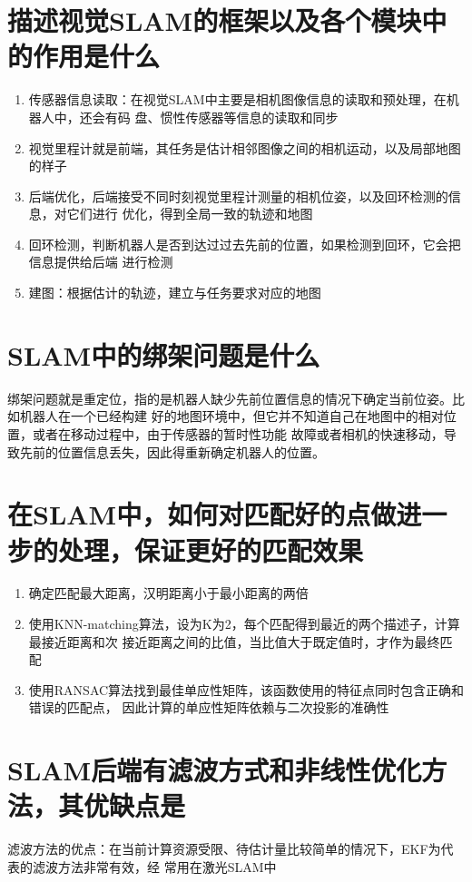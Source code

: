 \documentclass[10pt]{article}
\begin{document}
\section{描述视觉SLAM的框架以及各个模块中的作用是什么}
\begin{enumerate}
    \item 传感器信息读取：在视觉SLAM中主要是相机图像信息的读取和预处理，在机器人中，还会有码
    盘、惯性传感器等信息的读取和同步
    \item 视觉里程计就是前端，其任务是估计相邻图像之间的相机运动，以及局部地图的样子
    \item 后端优化，后端接受不同时刻视觉里程计测量的相机位姿，以及回环检测的信息，对它们进行
    优化，得到全局一致的轨迹和地图
    \item 回环检测，判断机器人是否到达过过去先前的位置，如果检测到回环，它会把信息提供给后端
    进行检测
    \item 建图：根据估计的轨迹，建立与任务要求对应的地图
\end{enumerate}
\section{SLAM中的绑架问题是什么}
绑架问题就是重定位，指的是机器人缺少先前位置信息的情况下确定当前位姿。比如机器人在一个已经构建
好的地图环境中，但它并不知道自己在地图中的相对位置，或者在移动过程中，由于传感器的暂时性功能
故障或者相机的快速移动，导致先前的位置信息丢失，因此得重新确定机器人的位置。
\section{在SLAM中，如何对匹配好的点做进一步的处理，保证更好的匹配效果}
\begin{enumerate}
    \item 确定匹配最大距离，汉明距离小于最小距离的两倍
    \item 使用KNN-matching算法，设为K为2，每个匹配得到最近的两个描述子，计算最接近距离和次
    接近距离之间的比值，当比值大于既定值时，才作为最终匹配
    \item 使用RANSAC算法找到最佳单应性矩阵，该函数使用的特征点同时包含正确和错误的匹配点，
    因此计算的单应性矩阵依赖与二次投影的准确性
\end{enumerate}
\section{SLAM后端有滤波方式和非线性优化方法，其优缺点是}
滤波方法的优点：在当前计算资源受限、待估计量比较简单的情况下，EKF为代表的滤波方法非常有效，经
常用在激光SLAM中
\end{document}
